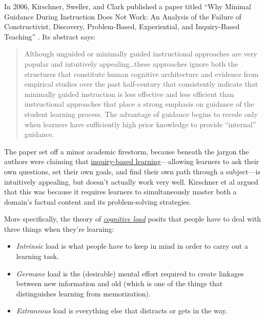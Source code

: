
In 2006, Kirschner, Sweller, and Clark published a paper titled ``Why
Minimal Guidance During Instruction Does Not Work: An Analysis of the
Failure of Constructivist, Discovery, Problem-Based, Experiential, and
Inquiry-Based Teaching'' \cite{fixme}. Its abstract says:

\begin{quote}

  Although unguided or minimally guided instructional approaches are
  very popular and intuitively appealing\ldots{}these approaches
  ignore both the structures that constitute human cognitive
  architecture and evidence from empirical studies over the past
  half-century that consistently indicate that minimally guided
  instruction is less effective and less efficient than instructional
  approaches that place a strong emphasis on guidance of the student
  learning process. The advantage of guidance begins to recede only
  when learners have sufficiently high prior knowledge to provide
  ``internal'' guidance.

\end{quote}

The paper set off a minor academic firestorm, because beneath the jargon
the authors were claiming that
\href{https://en.wikipedia.org/wiki/Inquiry-based\_learning}{inquiry-based
learning}---allowing learners to ask their own questions, set their
own goals, and find their own path through a subject---is intuitively
appealing, but doesn't actually work very well. Kirschner et al argued
that this was because it requires learners to simultaneously master
both a domain's factual content and its problem-solving strategies.

More specifically, the theory of
\emph{\href{https://en.wikipedia.org/wiki/Cognitive\_load}{cognitive load}}
posits that people have to deal with three things when they're
learning:

\begin{itemize}

\item
  \emph{Intrinsic} load is what people have to keep in mind in order to
  carry out a learning task.

\item
  \emph{Germane} load is the (desirable) mental effort required to
  create linkages between new information and old (which is one of the
  things that distinguishes learning from memorization).

\item
  \emph{Extraneous} load is everything else that distracts or gets in
  the way.

\end{itemize}

